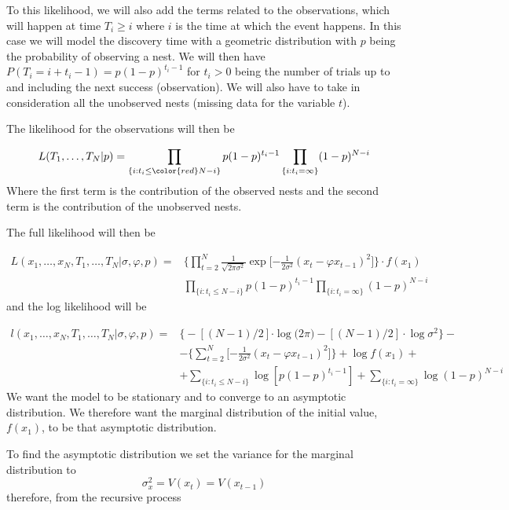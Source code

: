 \documentclass[11pt,a4paper]{article}
\begin{document}
{\color{red}To this likelihood, we will also add the terms related to the observations, which will happen at time $T_{i} \geq i$ where $i$ is the time at which the event happens. In this case we will model the discovery time with a geometric distribution with $p$ being the probability of observing a nest.  We will then have $P(T_{i} = i + t_i - 1) = p(1 - p)^{t_i - 1}$ for $t_i > 0$ being the number of trials up to and including the next success (observation). We will also have to take in consideration all the unobserved nests (missing data for the variable $t$).}

The likelihood for the observations will then be

\[
L(T_{1}, \dots, T_{N} | p) = \prod_{\{i:t_{i} \leq {\color{red}N - i} \}} p (1 - p)^{t_{i} - 1} \prod_{\{i: t_{i} = \infty\}} (1 - p)^{N - i }
\]
Where the first term is the contribution of the observed nests and the second term is the contribution of the unobserved nests.

The full likelihood will then be

\[
\begin{split}
L(x_{1}, \dots, x_{N} , T_{1}, \dots, T_{N} | \sigma, \varphi, p) = & \Bigg \{ \prod_{t=2}^{N}  \frac{1}{\sqrt{2 \pi \sigma^{2}}} \exp \Bigg [ { - \frac{1}{2 \sigma^{2}} }  (x_{t} - \varphi x_{t-1})^{2} \Bigg ] \Bigg \} \cdot f(x_{1}) \\ 
& \prod_{\{i:t_{i} \leq {N - i} \}} p (1 - p)^{t_{i} - 1} \prod_{\{i: t_{i} = \infty\}} (1 - p)^{N - i}
\end{split}
\]
and the log likelihood will be

\[
\begin{split}
l(x_{1}, \dots, x_{N} , T_{1}, \dots, T_{N} | \sigma, \varphi, p) = & \Bigg \{ -[(N - 1)/2]{ \cdot \log (2 \pi }) - [(N - 1)/2] \cdot{\log \sigma^{2}} \Bigg \} - \\
& - \Bigg \{ \sum_{t=2}^{N}  \Bigg [ { - \frac{1}{2 \sigma^{2}} }  (x_{t} - \varphi x_{t-1})^{2} \Bigg ] \Bigg \} + \log f(x_{1}) + \\
& +   \sum_{\{i:t_{i} \leq N - i \}} \log [p (1 - p)^{t_{i} - 1}] + \sum_{\{i: t_{i} = \infty\}} \log (1 - p)^{N - i }
\end{split}
\]
We want the model to be stationary and to converge to an asymptotic distribution. We therefore want the marginal distribution of the initial value, $f(x_{1})$, to be that asymptotic distribution.

To find the asymptotic distribution we set the variance for the marginal distribution to
\[
\sigma_{x}^2 = V(x_{t}) = V(x_{t-1})
\]
therefore, from the recursive process 
\end{document}

